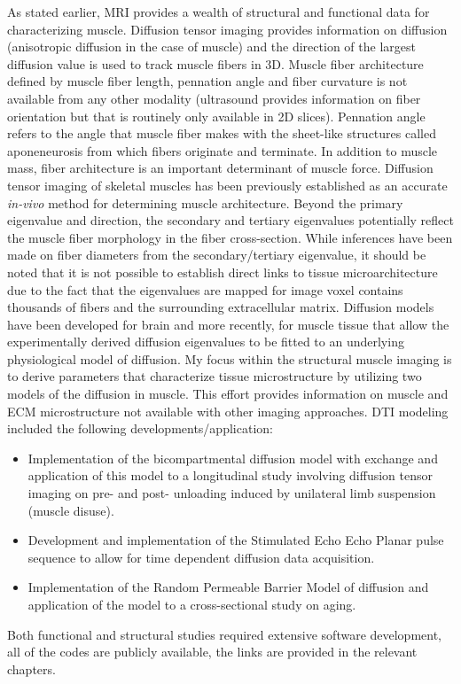 As stated earlier, MRI provides a wealth of structural and functional data for characterizing muscle. 
Diffusion tensor imaging provides information on diffusion (anisotropic diffusion in the case of muscle) and the direction of the largest diffusion value is used to track muscle fibers in 3D. 
Muscle fiber architecture defined by muscle fiber length, pennation angle and fiber curvature is not available from any other modality (ultrasound provides information on fiber orientation but that is routinely only available in 2D slices). 
Pennation angle refers to the angle that muscle fiber makes with the sheet-like structures called aponeneurosis from which fibers originate and terminate. 
In addition to muscle mass, fiber architecture is an important determinant of muscle force. 
Diffusion tensor imaging of skeletal muscles has been previously established as an accurate \textit{in-vivo} method for determining muscle architecture. 
Beyond the primary eigenvalue and direction, the secondary and tertiary eigenvalues potentially reflect the muscle fiber morphology in the fiber cross-section. 
While inferences have been made on fiber diameters from the secondary/tertiary eigenvalue, it should be noted that it is not possible to establish direct links to tissue microarchitecture due to the fact that the eigenvalues are mapped for image voxel contains thousands of fibers and the surrounding extracellular matrix. 
Diffusion models have been developed for brain and more recently, for muscle tissue that allow the experimentally derived diffusion eigenvalues to be fitted to an underlying physiological model of diffusion. 
My focus within the structural muscle imaging is to derive parameters that characterize tissue microstructure by utilizing two models of the diffusion in muscle. 
This effort provides information on muscle and ECM microstructure not available with other imaging approaches. 
DTI modeling included the following developments/application:
\begin{itemize}
\item Implementation of the bicompartmental diffusion model with exchange and application of this model to a longitudinal study involving diffusion tensor imaging on pre- and post- unloading induced by unilateral limb suspension (muscle disuse).
\item Development and implementation of the Stimulated Echo Echo Planar pulse sequence to allow for time dependent diffusion data acquisition.
\item Implementation of the Random Permeable Barrier Model of diffusion and application of the model to a cross-sectional study on aging.
\end{itemize}
Both functional and structural studies required extensive software development, all of the codes are publicly available, the links are provided in the relevant chapters.

